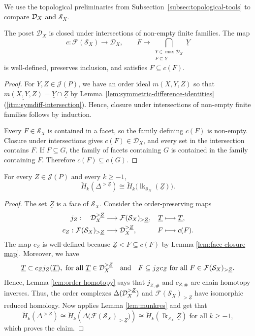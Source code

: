 \documentclass[a4paper,leqno]{amsart}
\begin{document}
We use the topological preliminaries from Subsection~\ref{subsec:topological-tools} to compare $\mathcal D_X$ and $\mathcal S_X$.

\begin{lem}\label{lem:face closure map}
The poset $\mathcal D_X$ is closed under intersections of non-empty finite families. The map
\[
c:\mathcal F(\mathcal S_X)\longrightarrow\mathcal D_X,\qquad
F\longmapsto\bigcap_{\substack{\underline{Y}\in\max\mathcal D_X\\F\subseteq \underline{Y}}}\underline{Y}
\]
is well-defined, preserves inclusion, and satisfies $F\subseteq c(F)$.
\end{lem}

\begin{proof}
For $Y,Z\in\mathcal{J}(P)$, we have an order ideal $m(X,Y,Z)$ so that $\underline{m(X,Y,Z)} = \underline{Y}\cap \underline{Z}$ by Lemma~\ref{lem:symmetric-difference-identities}\textup{(\ref{itm:symdiff-intersection})}. Hence, closure under intersections of non-empty finite families follows by induction.

Every $F\in\mathcal S_X$ is contained in a facet, so the family defining $c(F)$ is non-empty. Closure under intersections gives $c(F)\in\mathcal D_X$, and every set in the intersection contains $F$. If $F\subseteq G$, the family of facets containing $G$ is contained in the family containing $F$. Therefore $c(F)\subseteq c(G)$.
\end{proof}

\begin{lem}\label{lem:H(Delta Z)=H(lk DZ)}
For every $Z\in\mathcal J(P)$ and every $k\geq-1$,
\[
\widetilde H_k(\Delta^{>\underline{Z}})\cong
\widetilde H_k\bigl(\operatorname{lk}_{\mathcal S_X}(\underline{Z})\bigr).
\]
\end{lem}

\begin{proof}
The set $\underline{Z}$ is a face of $\mathcal S_X$. Consider the order-preserving maps
\begin{align*}
j_Z:\quad \mathcal D_X^{>\underline{Z}} &\longrightarrow\mathcal F(\mathcal S_X)_{>\underline{Z}},
&\underline{T}&\longmapsto \underline{T},\\
c_Z:\mathcal F(\mathcal S_X)_{>\underline{Z}}&\longrightarrow\mathcal D_X^{>\underline{Z}},
&F&\longmapsto c(F).
\end{align*}
The map $c_Z$ is well-defined because $\underline{Z}<F\subseteq c(F)$ by Lemma \ref{lem:face closure map}. Moreover, we have
\[
\underline{T}\subset c_Zj_Z(\underline{T}), \text{ for all $\underline{T}\in \mathcal D_X^{>\underline{Z}}$} \quad \text{and} \quad 
F\subseteq  j_Zc_Z \text{ for all $F\in\mathcal{F}(\mathcal{S}_X)_{>\underline{Z}}$.}
\]
Hence, Lemma \ref{lem:order homotopy} says that $j_{Z,\#}$ and $c_{Z,\#}$ are chain homotopy inverses. Thus, the order complexes $\Delta(\mathcal D_X^{>\underline{Z}})$ and $\mathcal F(\mathcal S_X)_{>\underline{Z}}$ have isomorphic reduced homology. Now applies Lemma \ref{lem:munkres} and get that
\[
\widetilde{H}_k(\Delta^{>\underline{Z}}) 
\cong \widetilde{H}_k(\Delta\big(\mathcal{F}(\mathcal{S}_X)_{>\underline{Z}}\big)) 
\cong \widetilde{H}_k(\operatorname{lk}_{\mathcal{S}_X}{\underline{Z}}) \text{ for all }k\ge -1,
\]
which proves the claim.
\end{proof}
\end{document}

